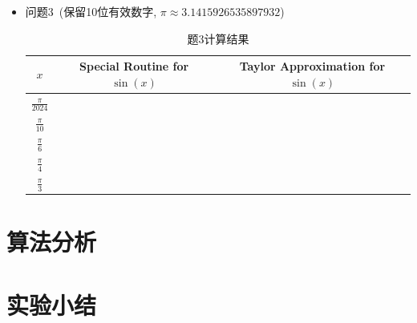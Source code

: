 \documentclass[UTF8]{ctexart}
\begin{document}
\begin{itemize}
 \item  问题3~(保留10位有效数字, $\pi \approx 3.14159 26535 897932$)
  \begin{table}[htb]
 \begin{center}
\begin{tabular}{|c|c|c|} %
\hline
 $x$  & Special Routine for $\sin(x)$ & Taylor Approximation for $\sin(x)$  \\
\hline
  $\frac{\pi}{2024}$ & $\quad\quad\quad\quad$ \quad & \\
  \hline
  $\frac{\pi}{10}$ & \quad & \\ \hline
  $\frac{\pi}{6}$  & \quad & \\ \hline
  $\frac{\pi}{4}$  &  & \\  \hline
  $\frac{\pi}{3}$  &  & \\
\hline
\end{tabular}
\end{center}
\caption{题3计算结果}
\end{table}


\end{itemize}


\section{算法分析}
\vspace{3.50cm}


\section{实验小结}
\vspace{2.0cm}
\end{document}

